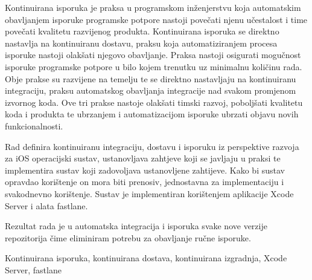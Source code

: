 \documentclass[times, utf8, diplomski, numeric]{fer}
\begin{document}
\begin{sazetak}

Kontinuirana isporuka je praksa u programskom inženjerstvu koja automatskim obavljanjem isporuke programske potpore nastoji povečati njenu učestalost i time povečati kvalitetu razvijenog produkta. Kontinuirana isporuka se direktno nastavlja na kontinuiranu dostavu, praksu koja automatiziranjem procesa isporuke nastoji olakšati njegovo obavljanje. Praksa nastoji osigurati mogučnost isporuke programske potpore u bilo kojem trenutku uz minimalnu količinu rada. Obje prakse su razvijene na temelju te se direktno nastavljaju na kontinuiranu integraciju, praksu automatskog obavljanja integracije nad svakom promjenom izvornog koda. Ove tri prakse nastoje olakšati timski razvoj, poboljšati kvalitetu koda i produkta te ubrzanjem i automatizacijom isporuke ubrzati objavu novih funkcionalnosti.

Rad definira kontinuiranu integraciju, dostavu i isporuku iz perspektive razvoja za iOS operacijski sustav, ustanovljava zahtjeve koji se javljaju u praksi te implementira sustav koji zadovoljava ustanovljene zahtijeve. Kako bi sustav opravdao korištenje on mora biti prenosiv, jednostavna za implementaciju i svakodnevno korištenje. Sustav je implementiran korištenjem aplikacije Xcode Server i alata fastlane.

Rezultat rada je u automatska integracija i isporuka svake nove verzije repozitorija čime eliminiram potrebu za obavljanje ručne isporuke.


Kontinuirana isporuka, kontinuirana dostava, kontinuirana izgradnja, Xcode Server, fastlane

\end{sazetak}


\clearpage
\end{document}
